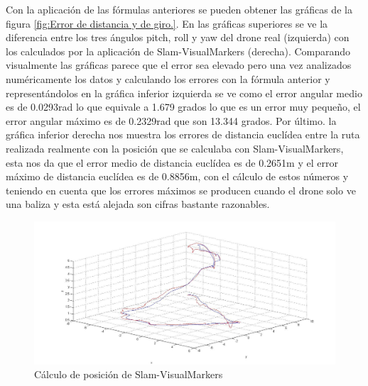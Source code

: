 \hspace{1cm} Con la aplicación de las fórmulas anteriores se pueden obtener las gráficas de la figura \ref{fig:Error de distancia y de giro.}. En las gráficas superiores se ve la diferencia entre los tres ángulos pitch, roll y yaw del drone real (izquierda) con los calculados por la aplicación de Slam-VisualMarkers (derecha). Comparando visualmente las gráficas parece que el error sea elevado pero una vez analizados numéricamente los datos y calculando los errores con la fórmula anterior y representándolos en la gráfica inferior izquierda se ve como el error angular medio es de 0.0293rad lo que equivale a 1.679 grados lo que es un error muy pequeño, el error angular máximo es de 0.2329rad que son 13.344 grados. Por último. la gráfica inferior derecha nos muestra los errores de distancia euclídea entre la ruta realizada realmente con la posición que se calculaba con Slam-VisualMarkers, esta nos da que el error medio de distancia euclídea es de 0.2651m y el error máximo de distancia euclídea es de 0.8856m, con el cálculo de estos números y teniendo en cuenta que los errores máximos se producen cuando el drone solo ve una baliza y esta está alejada son cifras bastante razonables.

\begin{figure}[H]
	\begin{center}
		\includegraphics[width=1\textwidth]{imag/IMG48.jpg}
				\caption{Cálculo de posición de Slam-VisualMarkers}
		\label{fig:Comparativa Slam-Visualmarkers.}	
	\end{center}
\end{figure}


